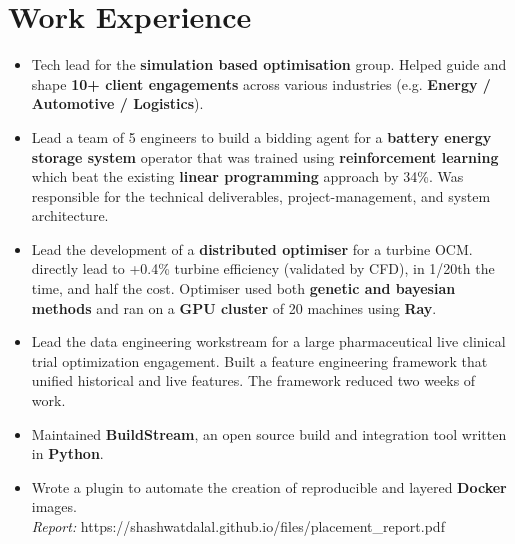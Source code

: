 \documentclass[a4paper]{deedy-resume} %
\begin{document}
\section{Work Experience}
\begin{itemize}
    \item Tech lead for the \textbf{simulation based optimisation} group. Helped guide and shape \textbf{10+ client engagements} across various industries (e.g. \textbf{Energy / Automotive / Logistics}). 
    \item Lead a team of 5 engineers to build a bidding agent for a \textbf{battery energy storage system} operator that was trained using \textbf{reinforcement learning} which beat the existing \textbf{linear programming} approach by 34\%. Was responsible for the technical deliverables, project-management, and system architecture.
    \item Lead the development of a \textbf{distributed optimiser} for a turbine OCM. directly lead to +0.4\% turbine efficiency (validated by CFD), in 1/20th the time, and half the cost. Optimiser used both \textbf{genetic and bayesian methods} and ran on a \textbf{GPU cluster} of 20 machines using \textbf{Ray}. 
    \item Lead the data engineering workstream for a large pharmaceutical live clinical trial optimization engagement. Built a feature engineering framework that unified historical and live features. The framework reduced two weeks of work.
\end{itemize} 
\begin{itemize}
    \item Maintained \textbf{BuildStream}, an open source build and integration tool written in \textbf{Python}.
    \item Wrote a plugin to automate the creation of reproducible and layered \textbf{Docker} images.
    \\
    \textit{Report:} https://shashwatdalal.github.io/files/placement\_report.pdf \\
\end{itemize}
\end{document}
